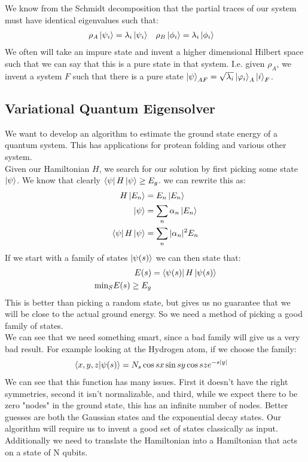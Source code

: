 We know from the Schmidt decomposition that the partial traces of our system must have identical eigenvalues such that:
\begin{align*}
	\rho_A \ket{\psi_i} &= \lambda_i \ket{\psi_i} &
	\rho_B \ket{\phi_i} &= \lambda_i \ket{\phi_i}
\end{align*}
We often will take an impure state and invent a higher dimensional Hilbert space such that we can say that this is a pure state in that system. 
I.e. given $\rho_A$, we invent a system $F$ such that there is a pure state $\ket{\psi}_{AF} = \sqrt{\lambda_i}\ket{\varphi_i}_A\ket{i}_F$.
\subsection{Variational Quantum Eigensolver}
We want to develop an algorithm to estimate the ground state energy of a quantum system. This has applications for protean folding and various other system. \\
Given our Hamiltonian $H$, we search for our solution by first picking some state $\ket{\psi}$. We know that clearly $\bra{\psi}H\ket{\psi} \geq E_g$. we can rewrite this as:
\begin{align*}
	H\ket{E_n} &= E_n\ket{E_n} \\
	\ket{\psi} &= \sum_n \alpha_n \ket{E_n} \\
	\bra{\psi}H\ket{\psi} &= \sum_n |\alpha_n|^2 E_n
\end{align*}
If we start with a family of states $\ket{\psi(s)}$ we can then state that:
\begin{align*}
	E(s) &= \bra{\psi(s)}H\ket{\psi(s)} \\
	\text{min}_S E(s) \geq E_g
\end{align*}
This is better than picking a random state, but gives us no guarantee that we will be close to the actual ground energy. So we need a method of picking a good family of states. \\
We can see that we need something smart, since a bad family will give us a very bad result. For example looking at the Hydrogen atom, if we choose the family:
\begin{align*}
	\bra{x,y,z}\ket{\psi(s)} &= N_s \cos sx \sin sy \cos sz e^{-s|y|}
\end{align*}
We can see that this function has many issues. First it doesn't have the right symmetries, second it isn't normalizable, and third, while we expect there to be zero "nodes" in the ground state, this has an infinite number of nodes. 
Better guesses are both the Gaussian states and the exponential decay states. Our algorithm will require us to invent a good set of states classically as input. Additionally we need to translate the Hamiltonian into a Hamiltonian that acts on a state of N qubits.\\
